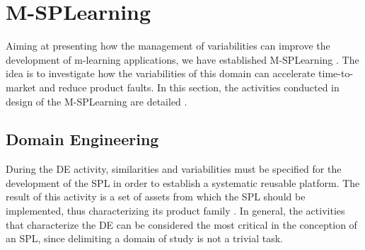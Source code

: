 \section{M-SPLearning}\label{section3}

Aiming at presenting how the management of variabilities can improve the development of m-learning applications, we have established M-SPLearning \cite{falvojr14a, falvojr14b}. The idea is to investigate how the variabilities of this domain can accelerate time-to-market and reduce product faults. In this section, the activities conducted in design of the M-SPLearning are detailed \cite{oliveirajr10, filho13, krueger02, kang90}.


\subsection{Domain Engineering}\label{section31}

During the DE activity, similarities and variabilities must be specified for the development of the SPL in order to establish a systematic reusable platform. The result of this activity is a set of assets from which the SPL should be implemented, thus characterizing its product family \cite{bockle05, vanderlinden07}. In general, the activities that characterize the DE can be considered the most critical in the conception of an SPL, since delimiting a domain of study is not a trivial task.

